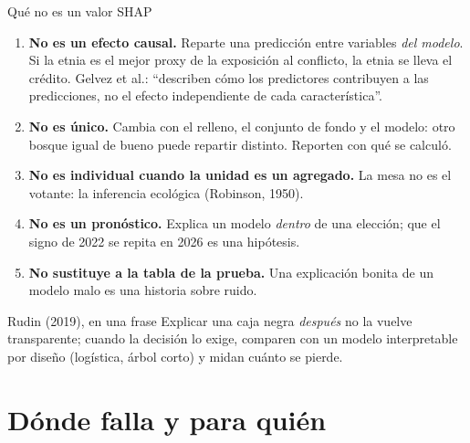 \documentclass{beamer}
\newcommand{\1}{\mathbb{I}}
\begin{document}
\begin{frame}{Qué no es un valor SHAP}
\small
\begin{enumerate}\itemsep2pt
  \item \textbf{No es un efecto causal.} Reparte una predicción entre variables \emph{del modelo}. Si la etnia es el mejor proxy de la exposición al conflicto, la etnia se lleva el crédito. Gelvez et al.: ``describen cómo los predictores contribuyen a las predicciones, no el efecto independiente de cada característica''. \pause
  \item \textbf{No es único.} Cambia con el relleno, el conjunto de fondo y el modelo: otro bosque igual de bueno puede repartir distinto. Reporten con qué se calculó. \pause
  \item \textbf{No es individual cuando la unidad es un agregado.} La mesa no es el votante: la inferencia ecológica (Robinson, 1950). \pause
  \item \textbf{No es un pronóstico.} Explica un modelo \emph{dentro} de una elección; que el signo de 2022 se repita en 2026 es una hipótesis. \pause
  \item \textbf{No sustituye a la tabla de la prueba.} Una explicación bonita de un modelo malo es una historia sobre ruido.
\end{enumerate}
\pause
\begin{block}{Rudin (2019), en una frase}
Explicar una caja negra \emph{después} no la vuelve transparente; cuando la decisión lo exige, comparen con un modelo interpretable por diseño (logística, árbol corto) y midan cuánto se pierde.
\end{block}
\end{frame}


\section{Dónde falla y para quién}
\begin{frame}[noframenumbering]
\tableofcontents[currentsection]
\end{frame}
\end{document}
